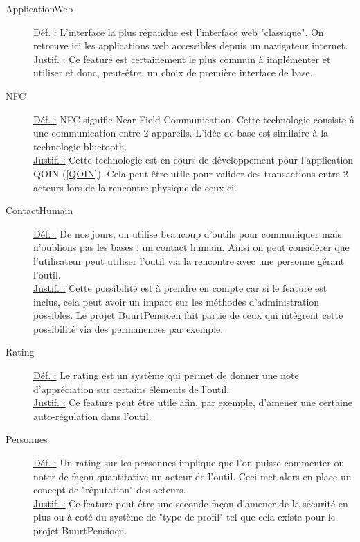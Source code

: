 \begin{description}
\item [ApplicationWeb]
\underline{Déf. :}  L'interface la plus répandue est l'interface web "classique".   On retrouve ici les applications web accessibles depuis un navigateur internet.  
\\ \underline{Justif. :}  Ce feature est certainement le plus commun à implémenter et utiliser et donc,  peut-être,  un choix de première interface de base.
\newline

\item [NFC]
\underline{Déf. :}  NFC signifie Near Field Communication.  Cette technologie consiste à une communication entre 2 appareils.  L'idée de base est similaire à la technologie bluetooth.
\\ \underline{Justif. :}  Cette technologie est en cours de développement pour l'application QOIN (\ref{QOIN}).  Cela peut être utile pour valider des transactions entre 2 acteurs lors de la rencontre physique de ceux-ci.
\newline

\item [ContactHumain]
\underline{Déf. :}  De nos jours,  on utilise beaucoup d'outils pour communiquer mais n'oublions pas les bases : un contact humain.  Ainsi on peut considérer que l'utilisateur peut utiliser l'outil via la rencontre avec une personne gérant l'outil.  
\\ \underline{Justif. :}  Cette possibilité est à prendre en compte car si le feature est inclus,  cela peut avoir un impact sur les méthodes d'administration possibles.  Le projet BuurtPensioen fait partie de ceux qui intègrent cette possibilité via des permanences par exemple.  
\newline

\begin{center}
\end{center}

\item [Rating]
\underline{Déf. :}  Le rating est un système qui permet de donner une note d'appréciation sur certains éléments de l'outil.
\\ \underline{Justif. :}  Ce feature peut être utile afin,  par exemple,  d'amener une certaine auto-régulation dans l'outil.
\newline

\item [Personnes]
\underline{Déf. :}  Un rating sur les personnes implique que l'on puisse commenter ou noter de façon quantitative un acteur de l'outil.  Ceci met alors en place un concept de "réputation" des acteurs.
\\ \underline{Justif. :}  Ce feature peut être une seconde façon d'amener de la sécurité en plus ou à coté du système de "type de profil" tel que cela existe pour le projet BuurtPensioen.
\newline


\end{description}
